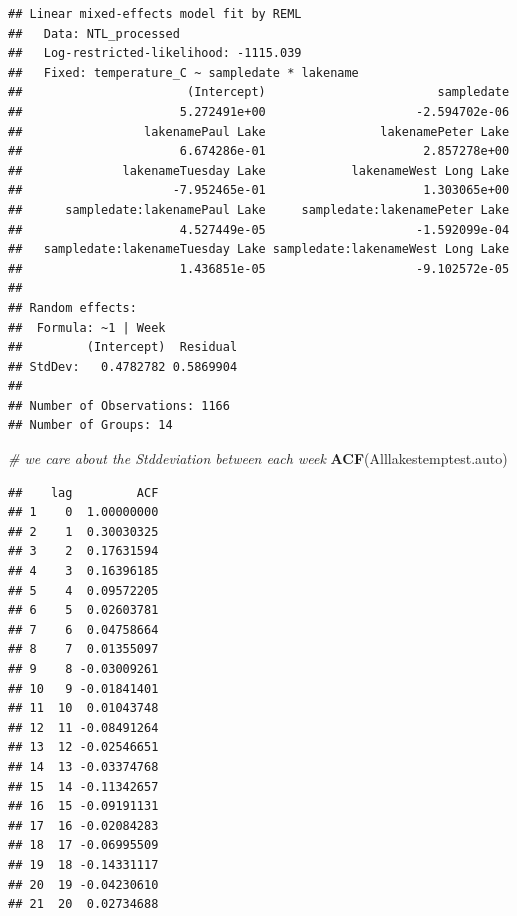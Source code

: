 \documentclass[12pt,]{article}
\newenvironment{Shaded}{\begin{snugshade}}{\end{snugshade}}
\newcommand{\KeywordTok}[1]{\textcolor[rgb]{0.13,0.29,0.53}{\textbf{#1}}}
\newcommand{\CommentTok}[1]{\textcolor[rgb]{0.56,0.35,0.01}{\textit{#1}}}
\newcommand{\NormalTok}[1]{#1}
\begin{document}
\begin{verbatim}
## Linear mixed-effects model fit by REML
##   Data: NTL_processed 
##   Log-restricted-likelihood: -1115.039
##   Fixed: temperature_C ~ sampledate * lakename 
##                       (Intercept)                        sampledate 
##                      5.272491e+00                     -2.594702e-06 
##                 lakenamePaul Lake                lakenamePeter Lake 
##                      6.674286e-01                      2.857278e+00 
##              lakenameTuesday Lake            lakenameWest Long Lake 
##                     -7.952465e-01                      1.303065e+00 
##      sampledate:lakenamePaul Lake     sampledate:lakenamePeter Lake 
##                      4.527449e-05                     -1.592099e-04 
##   sampledate:lakenameTuesday Lake sampledate:lakenameWest Long Lake 
##                      1.436851e-05                     -9.102572e-05 
## 
## Random effects:
##  Formula: ~1 | Week
##         (Intercept)  Residual
## StdDev:   0.4782782 0.5869904
## 
## Number of Observations: 1166
## Number of Groups: 14
\end{verbatim}

\begin{Shaded}
\begin{Highlighting}[]
\CommentTok{# we care about the Stddeviation between each week}
\KeywordTok{ACF}\NormalTok{(Alllakestemptest.auto)}
\end{Highlighting}
\end{Shaded}

\begin{verbatim}
##    lag         ACF
## 1    0  1.00000000
## 2    1  0.30030325
## 3    2  0.17631594
## 4    3  0.16396185
## 5    4  0.09572205
## 6    5  0.02603781
## 7    6  0.04758664
## 8    7  0.01355097
## 9    8 -0.03009261
## 10   9 -0.01841401
## 11  10  0.01043748
## 12  11 -0.08491264
## 13  12 -0.02546651
## 14  13 -0.03374768
## 15  14 -0.11342657
## 16  15 -0.09191131
## 17  16 -0.02084283
## 18  17 -0.06995509
## 19  18 -0.14331117
## 20  19 -0.04230610
## 21  20  0.02734688
\end{verbatim}
\end{document}
